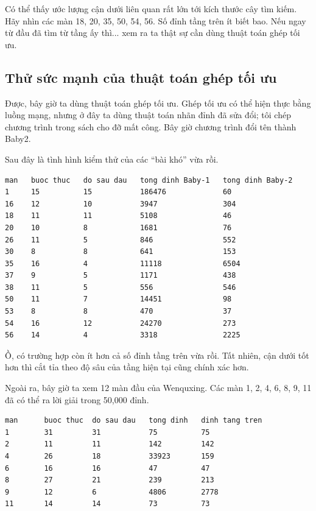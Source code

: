 \documentclass[11pt]{article}
\begin{document}
Có thể thấy ước lượng cận dưới liên quan rất lớn tới kích thước cây tìm kiếm.
Hãy nhìn các màn 18, 20, 35, 50, 54, 56. Số đỉnh tầng trên ít biết bao. Nếu
ngay từ đầu đã tìm từ tầng ấy thì... xem ra ta thật sự cần dùng thuật toán
ghép tối ưu.

\subsection{Thử sức mạnh của thuật toán ghép tối ưu}

Được, bây giờ ta dùng thuật toán ghép tối ưu. Ghép tối ưu có thể hiện thực
bằng luồng mạng, nhưng ở đây ta dùng thuật toán nhãn đỉnh đã sửa đổi; tôi
chép chương trình trong sách cho đỡ mất công. Bây giờ chương trình đổi tên
thành Baby2.

Sau đây là tình hình kiểm thử của các ``bài khó'' vừa rồi.

\begin{verbatim}
man   buoc thuc   do sau dau   tong dinh Baby-1   tong dinh Baby-2
1     15          15           186476             60
16    12          10           3947               304
18    11          11           5108               46
20    10          8            1681               76
26    11          5            846                552
30    8           8            641                153
35    16          4            11118              6504
37    9           5            1171               438
38    11          5            556                546
50    11          7            14451              98
53    8           8            470                37
54    16          12           24270              273
56    14          4            3318               2225
\end{verbatim}

Ồ, có trường hợp còn ít hơn cả số đỉnh tầng trên vừa rồi. Tất nhiên, cận
dưới tốt hơn thì cắt tỉa theo độ sâu của tầng hiện tại cũng chính xác hơn.

Ngoài ra, bây giờ ta xem 12 màn đầu của Wenquxing. Các màn 1, 2, 4, 6, 8, 9,
11 đã có thể ra lời giải trong 50,000 đỉnh.

\begin{verbatim}
man      buoc thuc  do sau dau   tong dinh   dinh tang tren
1        31         31           75          75
2        11         11           142         142
4        26         18           33923       159
6        16         16           47          47
8        27         21           239         213
9        12         6            4806        2778
11       14         14           73          73
\end{verbatim}
\end{document}
